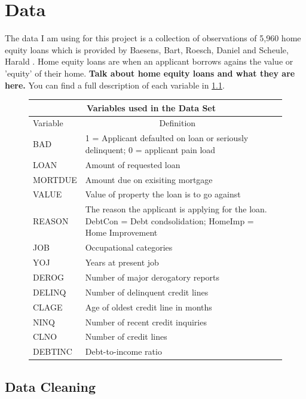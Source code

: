 \chapter{Data} \label{cha:chapter-2}

The data I am using for this project is a collection of observations of 5,960 home equity loans which is provided by Baesens, Bart, Roesch, Daniel and Scheule, Harald \cite{baesens2016credit}. Home equity loans are when an applicant borrows agains the value or 'equity' of their home. \textbf{Talk about home equity loans and what they are here.} You can find a full description of each variable in \ref{Table2}.

\begin{figure}[ht]\label{Table2}
	\centering
	\renewcommand{\arraystretch}{1.25}
	\begin{tabular}{l p{6.8cm} p{5cm}}
	\multicolumn{2}{c}{Variables used in the Data Set}\cite{baesens2016credit}\\
	\hline
	Variable & \multicolumn{1}{c}{Definition}\\ 
	\hline
	BAD & 1 = Applicant defaulted on loan or seriously delinquent; 0 = applicant pain load \\
	LOAN & Amount of requested loan \\
	MORTDUE & Amount due on exisiting mortgage \\
	VALUE & Value of property the loan is to go against \\
	REASON & The reason the applicant is applying for the loan. DebtCon = Debt condsolidation; HomeImp = Home Improvement \\
	JOB & Occupational categories \\
	YOJ & Years at present job \\
	DEROG & Number of major derogatory reports \\
	DELINQ & Number of delinquent credit lines \\
	CLAGE & Age of oldest credit line in months \\
	NINQ & Number of recent credit inquiries \\
	CLNO & Number of credit lines \\
	DEBTINC & Debt-to-income ratio \\
	\end{tabular}
\end{figure}

\section{Data Cleaning}

